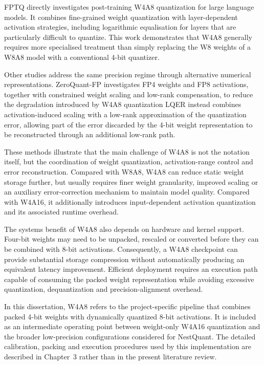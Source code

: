 FPTQ directly investigates post-training W4A8 quantization for large
language models. It combines fine-grained weight quantization with
layer-dependent activation strategies, including logarithmic
equalisation for layers that are particularly difficult to quantize. This work demonstrates that W4A8 generally requires
more specialised treatment than simply replacing the W8 weights of a
W8A8 model with a conventional 4-bit quantizer.

Other studies address the same precision regime through alternative
numerical representations. ZeroQuant-FP investigates FP4 weights and
FP8 activations, together with constrained weight scaling and
low-rank compensation, to reduce the degradation introduced by W4A8
quantization LQER instead combines activation-induced
scaling with a low-rank approximation of the quantization error,
allowing part of the error discarded by the 4-bit weight representation
to be reconstructed through an additional low-rank path.

These methods illustrate that the main challenge of W4A8 is not the
notation itself, but the coordination of weight quantization,
activation-range control and error reconstruction. Compared with
W8A8, W4A8 can reduce static weight storage further, but usually
requires finer weight granularity, improved scaling or an auxiliary
error-correction mechanism to maintain model quality. Compared with
W4A16, it additionally introduces input-dependent activation
quantization and its associated runtime overhead.

The systems benefit of W4A8 also depends on hardware and kernel support.
Four-bit weights may need to be unpacked, rescaled or converted before
they can be combined with 8-bit activations. Consequently, a W4A8
checkpoint can provide substantial storage compression without
automatically producing an equivalent latency improvement. Efficient
deployment requires an execution path capable of consuming the packed
weight representation while avoiding excessive quantization,
dequantization and precision-alignment overhead.

In this dissertation, W4A8 refers to the project-specific pipeline that
combines packed 4-bit weights with dynamically quantized 8-bit
activations. It is included as an intermediate operating point between
weight-only W4A16 quantization and the broader low-precision
configurations considered for NestQuant. The detailed calibration,
packing and execution procedures used by this implementation are
described in Chapter~3 rather than in the present literature review.

